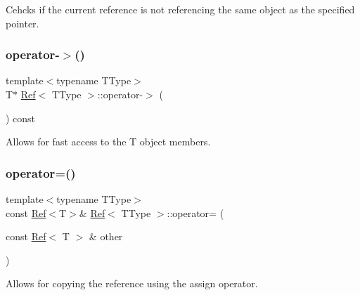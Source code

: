 Cehcks if the current reference is not referencing the same object as the specified pointer. 

\mbox{\label{class_ref_a8a8746320aa81f63d923172305b8d173}} 
\subsubsection{\texorpdfstring{operator-\/$>$()}{operator->()}}
{\footnotesize\ttfamily template$<$typename T\+Type$>$ \\
T$\ast$ \mbox{\hyperlink{class_ref}{Ref}}$<$ T\+Type $>$\+::operator-\/$>$ (\begin{DoxyParamCaption}{ }\end{DoxyParamCaption}) const\hspace{0.3cm}{\ttfamily [inline]}}



Allows for fast access to the T object members. 

\mbox{\label{class_ref_aaf07d54c8951e7f026faef51950c18a6}} 
\subsubsection{\texorpdfstring{operator=()}{operator=()}}
{\footnotesize\ttfamily template$<$typename T\+Type$>$ \\
const \mbox{\hyperlink{class_ref}{Ref}}$<$T$>$\& \mbox{\hyperlink{class_ref}{Ref}}$<$ T\+Type $>$\+::operator= (\begin{DoxyParamCaption}\item[{const \mbox{\hyperlink{class_ref}{Ref}}$<$ T $>$ \&}]{other }\end{DoxyParamCaption})\hspace{0.3cm}{\ttfamily [inline]}}



Allows for copying the reference using the assign operator. 

\mbox{\label{class_ref_aab8b77f0e2128c4c373909703e14df5d}} 
